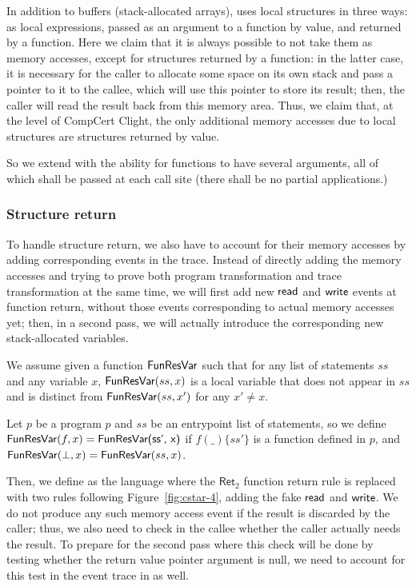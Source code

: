 In addition to buffers (stack-allocated arrays), \cstar uses local
structures in three ways: as local expressions, passed as an argument
to a function by value, and returned by a function. Here we claim that
it is always possible to not take them as memory accesses, except for
structures returned by a function: in the latter case, it is necessary
for the caller to allocate some space on its own stack and pass a
pointer to it to the callee, which will use this pointer to store its
result; then, the caller will read the result back from this memory
area. Thus, we claim that, at the level of CompCert Clight, the only
additional memory accesses due to local structures are structures
returned by value.

So we extend  with the ability for functions to have several
arguments, all of which shall be passed at each call site (there shall
be no partial applications.)

\subsubsection{Structure return} \label{sec:struct-return}
To handle structure return, we also have to account for their memory
accesses by adding corresponding events in the trace. Instead of
directly adding the memory accesses and trying to prove both program
transformation and trace transformation at the same time, we will
first add new $\text{\textsf{read}}$ and $\text{\textsf{write}}$ events at function return,
without those events corresponding to actual memory accesses yet;
then, in a second pass, we will actually introduce the corresponding
new stack-allocated variables.

We assume given a function $\text{\textsf{FunResVar}}$ such that for any list of
statements $ss$ and any variable $x$, $\text{\textsf{FunResVar}}(ss, x)$ is a
local variable that does not appear in $ss$ and is distinct from
$\text{\textsf{FunResVar}}(ss, x')$ for any $x' \not= x$.

Let $p$ be a program $p$ and $ss$ be an entrypoint list of statements,
so we define $\text{\textsf{FunResVar}}(f, x) = \text{\textsf{FunResVar(ss', x)}}$ if $f
(\_) \{ ss' \}$ is a function defined in $p$, and
$\text{\textsf{FunResVar}}(\bot, x) = \text{\textsf{FunResVar}}(ss,x)$.

Then, we define  as the language  where the $\textsf{Ret}_2$
function return rule is replaced with two rules following
Figure~\ref{fig:cstar-4}, adding the fake $\text{\textsf{read}}$ and
$\text{\textsf{write}}$. We do not produce any such memory access event if the
result is discarded by the caller; thus, we also need to check in the
callee whether the caller actually needs the result. To prepare for
the second pass where this check will be done by testing whether the
return value pointer argument is null, we need to account for this
test in the event trace in  as well.

